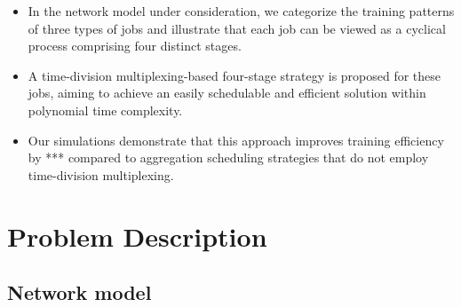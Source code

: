 \documentclass[conference]{IEEEtran}
\begin{document}
\begin{itemize}
	
	\item In the network model under consideration, we categorize the training patterns of three types of jobs and illustrate that each job can be viewed as a cyclical process comprising four distinct stages.
	
	
	\item A time-division multiplexing-based four-stage strategy is proposed for these jobs, aiming to achieve an easily schedulable and efficient solution within polynomial time complexity.
	
	
	\item Our simulations demonstrate that this approach improves training efficiency by *** compared to aggregation scheduling strategies that do not employ time-division multiplexing.
\end{itemize}

\section{Problem Description}

\subsection{Network model}
\end{document}

